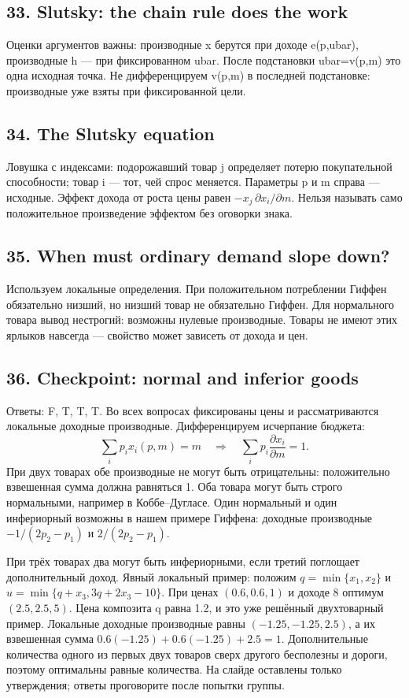 \documentclass[11pt,a4paper]{article}
\begin{document}
\subsection*{33. Slutsky: the chain rule does the work}
Оценки аргументов важны: производные x берутся при доходе e(p,ubar), производные h — при фиксированном ubar. После подстановки ubar=v(p,m) это одна исходная точка. Не дифференцируем v(p,m) в последней подстановке: производные уже взяты при фиксированной цели.

\subsection*{34. The Slutsky equation}
Ловушка с индексами: подорожавший товар j определяет потерю покупательной способности; товар i — тот, чей спрос меняется. Параметры p и m справа — исходные. Эффект дохода от роста цены равен $-x_j\,\partial x_i/\partial m$. Нельзя называть само положительное произведение эффектом без оговорки знака.

\subsection*{35. When must ordinary demand slope down?}
Используем локальные определения. При положительном потреблении Гиффен обязательно низший, но низший товар не обязательно Гиффен. Для нормального товара вывод нестрогий: возможны нулевые производные. Товары не имеют этих ярлыков навсегда — свойство может зависеть от дохода и цен.

\subsection*{36. Checkpoint: normal and inferior goods}
Ответы: F, T, T, T. Во всех вопросах фиксированы цены и рассматриваются локальные доходные производные. Дифференцируем исчерпание бюджета:
\[\sum_i p_i x_i(p,m)=m\quad\Rightarrow\quad\sum_i p_i\frac{\partial x_i}{\partial m}=1.\]
При двух товарах обе производные не могут быть отрицательны: положительно взвешенная сумма должна равняться 1. Оба товара могут быть строго нормальными, например в Коббе--Дугласе. Один нормальный и один инфериорный возможны в нашем примере Гиффена: доходные производные $-1/(2p_2-p_1)$ и $2/(2p_2-p_1)$.

При трёх товарах два могут быть инфериорными, если третий поглощает дополнительный доход. Явный локальный пример: положим $q=\min\{x_1,x_2\}$ и $u=\min\{q+x_3,3q+2x_3-10\}$. При ценах $(0.6,0.6,1)$ и доходе 8 оптимум $(2.5,2.5,5)$. Цена композита q равна 1.2, и это уже решённый двухтоварный пример. Локальные доходные производные равны $(-1.25,-1.25,2.5)$, а их взвешенная сумма $0.6(-1.25)+0.6(-1.25)+2.5=1$. Дополнительные количества одного из первых двух товаров сверх другого бесполезны и дороги, поэтому оптимальны равные количества. На слайде оставлены только утверждения; ответы проговорите после попытки группы.
\end{document}
